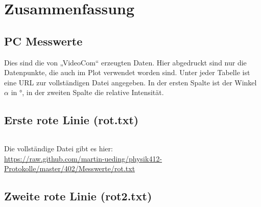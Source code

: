 
\FloatBarrier
\chapter{Zusammenfassung}

\fehlt


\FloatBarrier
\begin{appendix}
    \chapter{PC Messwerte}
    \label{sec:pc_messwerte}

    Dies sind die von „VideoCom“ erzeugten Daten. Hier abgedruckt sind nur die
    Datenpunkte, die auch im Plot verwendet worden sind. Unter jeder Tabelle
    ist eine URL zur vollständigen Datei angegeben. In der ersten Spalte ist
    der Winkel $\alpha$ in $\si\degree$, in der zweiten Spalte die relative
    Intensität.

    \section{Erste rote Linie (rot.txt)}
    \begin{multicols}{5}
        \inputminted[tabsize=4, firstline=<< rot_lower >>, lastline=<< rot_upper >>, fontsize=\footnotesize]{text}{../Messwerte/rot.txt}
    \end{multicols}

    Die vollständige Datei gibt es hier: \\
    \url{https://raw.github.com/martin-ueding/physik412-Protokolle/master/402/Messwerte/rot.txt}

    \section{Zweite rote Linie (rot2.txt)}
    \begin{multicols}{5}
        \inputminted[tabsize=4, firstline=<< rot2_lower >>, lastline=<< rot2_upper >>, fontsize=\footnotesize]{text}{../Messwerte/rot2.txt}
    \end{multicols}


\end{appendix}
